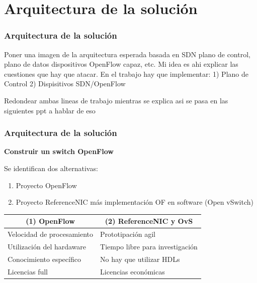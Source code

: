 \documentclass{beamer}
\begin{document}
\section{Arquitectura de la soluci\'on} 

\begin{frame}
\frametitle{Arquitectura de la soluci\'on} 

Poner una imagen de la arquitectura esperada basada en SDN
plano de control, plano de datos dispositivos OpenFlow capaz, etc. Mi idea es ahi explicar
las cuestiones que hay que atacar. En el trabajo hay que implementar:
1) Plano de Control
2) Dispisitivos SDN/OpenFlow

Redondear ambas lineas de trabajo mientras se explica asi se pasa en las siguientes ppt a hablar de eso

\end{frame}

\begin{frame}
\frametitle{Arquitectura de la soluci\'on} 

\textbf{Construir un switch OpenFlow} 

\vspace{0.3cm}
Se identifican dos alternativas: 
\begin{enumerate}
\item Proyecto OpenFlow
\item Proyecto ReferenceNIC m\'as implementaci\'on OF en software (Open vSwitch)
\end{enumerate}

\begin{table}[]
\small
\centering
\label{label}
\begin{tabular}{| p{5cm} | p{5cm} |}

\hline
\multicolumn{1}{|c|}{(1) OpenFlow } & \multicolumn{1}{c|}{(2) ReferenceNIC y OvS } \\
\hline
Velocidad de procesamiento & Prototipaci\'on agil \\
Utilizaci\'on del hardaware &  Tiempo libre para investigaci\'on \\
Conocimiento espec\'ifico &  No hay que utilizar HDLs \\
Licencias full &  Licencias econ\'omicas \\

\hline  
\end{tabular}
\end{table}

\end{frame}
\end{document}
